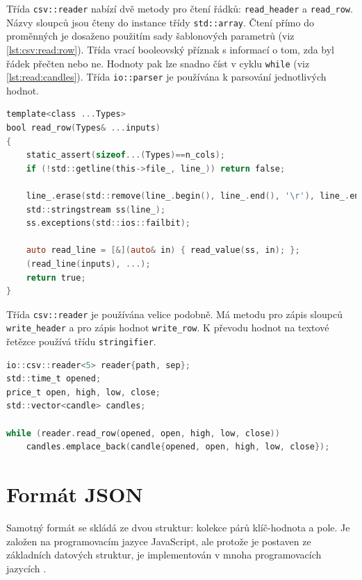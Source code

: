 Třída \texttt{csv::reader} nabízí dvě metody pro čtení řádků: \texttt{read\_header} a \texttt{read\_row}.
Názvy sloupců jsou čteny do instance třídy \texttt{std::array}.
Čtení přímo do proměnných je dosaženo použitím sady šablonových parametrů (viz \ref{lst:csv:read:row}).
Třída vrací booleovský příznak s informací o tom, zda byl řádek přečten nebo ne.
Hodnoty pak lze snadno číst v cyklu \texttt{while} (viz \ref{lst:read:candles}).
Třída \texttt{io::parser} je používána k parsování jednotlivých hodnot.

\begin{lstlisting}[caption={~Implementace čtení řádky třídy \texttt{io::csv::reader}},label={lst:csv:read:row},captionpos=t,abovecaptionskip=-\medskipamount,belowcaptionskip=\medskipamount,language=C]
template<class ...Types>
bool read_row(Types& ...inputs)
{
    static_assert(sizeof...(Types)==n_cols);
    if (!std::getline(this->file_, line_)) return false;

    line_.erase(std::remove(line_.begin(), line_.end(), '\r'), line_.end());
    std::stringstream ss(line_);
    ss.exceptions(std::ios::failbit);

    auto read_line = [&](auto& in) { read_value(ss, in); };
    (read_line(inputs), ...);
    return true;
}
\end{lstlisting}

Třída \texttt{csv::reader} je používána velice podobně.
Má metodu pro zápis sloupců \texttt{write\_header} a pro zápis hodnot \texttt{write\_row}.
K převodu hodnot na textové řetězce používá třídu \texttt{stringifier}.

\begin{lstlisting}[caption={~Ukázka čtení svíček pomocí \texttt{io::csv::reader}},label={lst:read:candles},captionpos=t,abovecaptionskip=-\medskipamount,belowcaptionskip=\medskipamount,language=C]
io::csv::reader<5> reader{path, sep};
std::time_t opened;
price_t open, high, low, close;
std::vector<candle> candles;

while (reader.read_row(opened, open, high, low, close))
    candles.emplace_back(candle{opened, open, high, low, close});
\end{lstlisting}

\section{Formát JSON}
Samotný formát se skládá ze dvou struktur: kolekce párů klíč-hodnota a pole.
Je založen na programovacím jazyce JavaScript, ale protože je postaven ze základních datových struktur, je implementován v mnoha programovacích jazycích \cite{json}.

